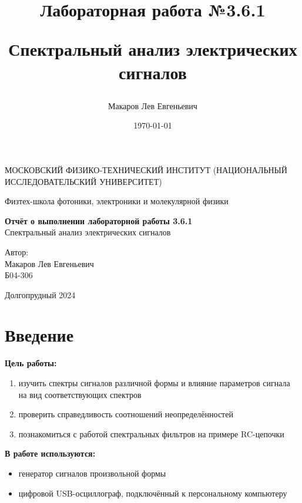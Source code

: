 \documentclass[a4paper,12pt]{article}
\author{Макаров Лев Евгеньевич}
\title{Лабораторная работа №3.6.1

Спектральный анализ электрических сигналов
}
\date{\today}
\begin{document}
\begin{titlepage}
	\begin{center}
		{\large МОСКОВСКИЙ ФИЗИКО-ТЕХНИЧЕСКИЙ ИНСТИТУТ (НАЦИОНАЛЬНЫЙ ИССЛЕДОВАТЕЛЬСКИЙ УНИВЕРСИТЕТ)}
	\end{center}
	\begin{center}
		{\large Физтех-школа фотоники, электроники и молекулярной физики}
	\end{center}
	
	
	\vspace{4.5cm}
	{\huge
		\begin{center}
			{\bf Отчёт о выполнении лабораторной работы 3.6.1}\\
			Спектральный анализ электрических сигналов
		\end{center}
	}
	\vspace{2cm}
	\begin{flushright}
		{\LARGE Автор:\\ Макаров Лев Евгеньевич \\
			\vspace{0.2cm}
			Б04-306}
	\end{flushright}
	\vspace{8cm}
	\begin{center}
		Долгопрудный 2024
	\end{center}
\end{titlepage}

\section{Введение}

\textbf{Цель работы:} 
\begin{enumerate}
	\item изучить спектры сигналов различной формы и влияние параметров сигнала на вид соответствующих спектров
    \item проверить справедливость соотношений неопределённостей
    \item познакомиться с работой спектральных фильтров на примере RC-цепочки
\end{enumerate}

\textbf{В работе используются:} 
\begin{itemize}
    \item генератор сигналов произвольной формы
    \item цифровой USB-осциллограф, подключённый к персональному компьютеру
\end{itemize}
\medskip
\end{document}
